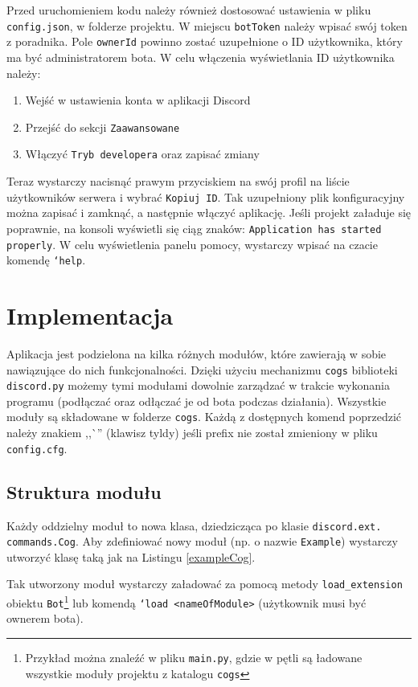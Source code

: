 \documentclass[shortabstract,inz]{iithesis}
\begin{document}
	Przed uruchomieniem kodu należy również dostosować ustawienia w pliku \texttt{config.json}, w folderze projektu. W miejscu \texttt{botToken} należy wpisać swój token z poradnika\cite{discorddev}. Pole \texttt{ownerId} powinno zostać uzupełnione o ID użytkownika, który ma być administratorem bota. W celu włączenia wyświetlania ID użytkownika należy:
	\begin{enumerate}
		\item Wejść w ustawienia konta w aplikacji Discord
		\item Przejść do sekcji \texttt{Zaawansowane}
		\item Włączyć \texttt{Tryb developera} oraz zapisać zmiany
	\end{enumerate}
	Teraz wystarczy nacisnąć prawym przyciskiem na swój profil na liście użytkowników serwera i wybrać \texttt{Kopiuj ID}.
	Tak uzupełniony plik konfiguracyjny można zapisać i zamknąć, a następnie włączyć aplikację. Jeśli projekt załaduje się poprawnie, na konsoli wyświetli się ciąg znaków: \texttt{Application has started properly}. W celu wyświetlenia panelu pomocy, wystarczy wpisać na czacie komendę \texttt{`help}.
		
	\chapter{Implementacja}
		Aplikacja jest podzielona na kilka różnych modułów, które zawierają w sobie nawiązujące do nich funkcjonalności. Dzięki użyciu mechanizmu \texttt{cogs} biblioteki \texttt{discord.py} możemy tymi modułami dowolnie zarządzać w trakcie wykonania programu (podłączać oraz odłączać je od bota podczas działania). Wszystkie moduły są składowane w folderze \texttt{cogs}.
		Każdą z dostępnych komend poprzedzić należy znakiem ,,\`{ }'' (klawisz tyldy) jeśli prefix nie został zmieniony w pliku \texttt{config.cfg}.  
		\section{Struktura modułu}
		Każdy oddzielny moduł to nowa klasa, dziedzicząca po klasie \texttt{discord.ext.
			commands.Cog}. Aby zdefiniować nowy moduł (np. o nazwie \texttt{Example}) wystarczy utworzyć klasę taką jak na Listingu \ref{exampleCog}. 
		
		Tak utworzony moduł wystarczy załadować za pomocą metody \texttt{load\_extension} obiektu \texttt{Bot}\footnote{Przykład można znaleźć w pliku \texttt{main.py}, gdzie w pętli są ładowane wszystkie moduły projektu z katalogu \texttt{cogs}} lub komendą \texttt{`load <nameOfModule>} (użytkownik musi być ownerem bota).  
		
\end{document}
